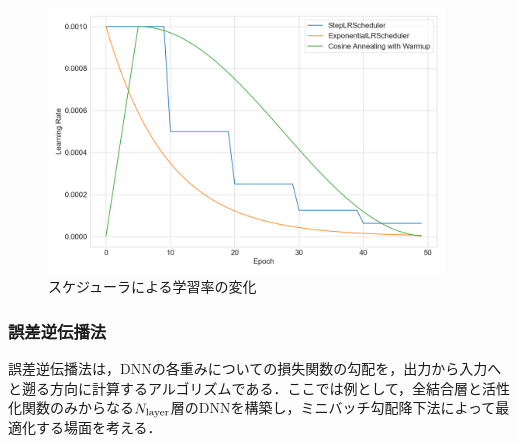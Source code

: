\documentclass[12pt]{jarticle}
\numberwithin{equation}{section}    %
\numberwithin{figure}{section}      %
\numberwithin{table}{section}      %
\begin{document}
\begin{figure}[bt]
    \centering
    \includegraphics[height=70mm]{./figure/sec3/lr_scheduler.png}
    \caption{スケジューラによる学習率の変化}
    \label{sec3:fig:lr_scheduler}
\end{figure}

\subsubsection{誤差逆伝播法}
\label{sec3:sec:backpropagation}
誤差逆伝播法は，DNNの各重みについての損失関数の勾配を，出力から入力へと遡る方向に計算するアルゴリズムである．ここでは例として，全結合層と活性化関数のみからなる$N_{\text{layer}}$層のDNNを構築し，ミニバッチ勾配降下法によって最適化する場面を考える\cite{higham2019deep}．
\end{document}
